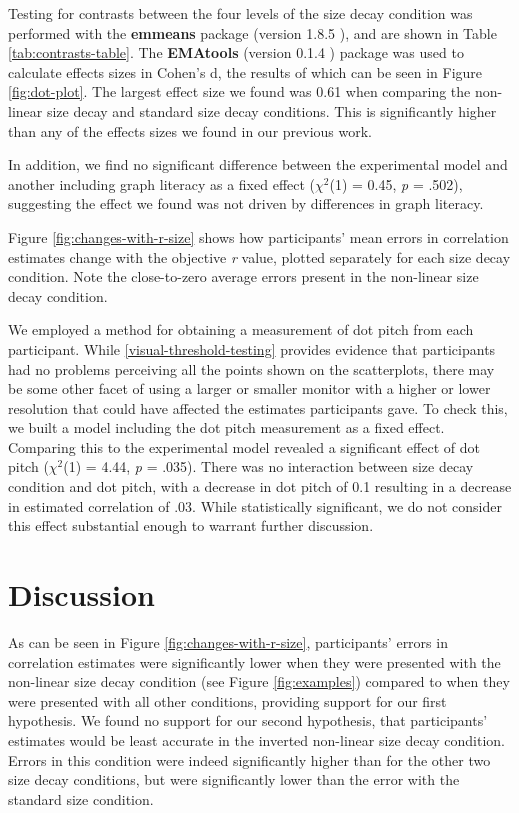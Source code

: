 \documentclass{vgtc}                          %
\begin{document}
Testing for contrasts between the four levels of the size decay condition
was performed with the \textbf{emmeans} package (version 1.8.5 \cite{emmeans}), and
are shown in Table \ref{tab:contrasts-table}. The \textbf{EMAtools} (version
0.1.4 \cite{ematools}) package was used to calculate effects sizes in Cohen's d, the results of which can be seen in Figure \ref{fig:dot-plot}. The largest effect size we found was 0.61 when comparing
the non-linear size decay and standard size decay conditions. This is significantly higher
than any of the effects sizes we found in our previous work.

In addition, we find no significant difference between the experimental model
and another including graph literacy as a fixed effect (\(\chi^2\)(1) = 0.45, \emph{p} = .502), suggesting the effect we found was not driven by differences in graph literacy.

Figure \ref{fig:changes-with-r-size} shows how participants' mean errors in correlation
estimates change with the objective \emph{r} value, plotted separately for each
size decay condition. Note the close-to-zero average errors present in the non-linear size
decay condition.

We employed a method for obtaining
a measurement of dot pitch from each participant. While \autoref{visual-threshold-testing}
provides evidence that participants had no problems perceiving all the points
shown on the scatterplots, there may be some other facet of using a larger or smaller
monitor with a higher or lower resolution that could have affected the estimates
participants gave. To check this, we built a model including the dot pitch
measurement as a fixed effect. Comparing this to the experimental model revealed
a significant effect of dot pitch (\(\chi^2\)(1) = 4.44, \emph{p} = .035). There was no
interaction between size decay condition and dot pitch, with a decrease in dot
pitch of 0.1 resulting in a decrease in estimated correlation of .03.
While statistically significant, we do not consider this effect substantial
enough to warrant further discussion.

\hypertarget{discussion}{%
\section{Discussion}\label{discussion}}

As can be seen in Figure \ref{fig:changes-with-r-size},
participants' errors in correlation estimates were significantly lower when
they were presented with the non-linear size decay condition (see Figure \ref{fig:examples})
compared to when they were presented with all other conditions, providing support for our
first hypothesis. We found no support for our second hypothesis, that participants'
estimates would be least accurate in the inverted non-linear size decay condition.
Errors in this condition were indeed significantly higher than for the other two
size decay conditions, but were significantly lower than
the error with the standard size condition.
\end{document}
